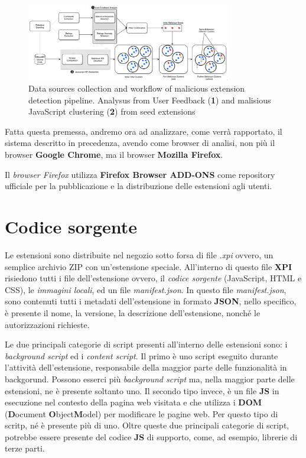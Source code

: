 \documentclass[ 11pt, oneside, italian, onehalfspacing, headsepline, ]{MastersDoctoralThesis}
\begin{document}
\begin{figure}[hbt!]
	\caption{Data sources collection and workflow of malicious extension detection pipeline. Analysus from User Feedback (\textbf{1}) and malisious JavaScript clustering (\textbf{2}) from seed extensions}\label{fig:summarydiagram}
	\centering
	\includegraphics[width=0.8\textwidth]{Summary_diagram.png}
\end{figure}

\par

Fatta questa premessa, andremo ora ad analizzare, come verrà rapportato, il sistema descritto in precedenza, avendo come browser di analisi, non più il browser \textbf{Google Chrome}, ma il browser \textbf{Mozilla Firefox}. \newline

Il \textit{browser Firefox} utilizza \textbf{Firefox Browser ADD-ONS} \citep{FirefoxAddOnsStore} come repository ufficiale per la pubblicazione e la distribuzione delle estensioni agli utenti. 

{\section{Codice sorgente}}

Le estensioni sono distribuite nel negozio sotto forsa di file \textit{.xpi} ovvero, un semplice archivio ZIP con un'estensione speciale. All'interno di questo file \textbf{XPI} risiedono tutti i file dell'estensione ovvero, il \textit{codice sorgente} (JavaScript, HTML e CSS), le \textit{immagini locali}, ed un file \textit{manifest.json}. In questo file \textit{manifest.json}, sono contenuti tutti i metadati dell'estensione in formato \textbf{JSON}, nello specifico, è presente il nome, la versione, la descrizione dell'estensione, nonché le autorizzazioni richieste. \newline

Le due principali categorie di script presenti all'interno delle estensioni sono: i \textit{background script} ed i \textit{content script}. Il primo  è uno script eseguito durante l'attività dell'estensione, responsabile della maggior parte delle funzionalità in backgorund. Possono esserci più \textit{background script} ma, nella maggior parte delle estensioni, ne è presente soltanto uno. Il secondo tipo invece, è un file \textbf{JS} in esecuzione nel contesto della pagina web visitata e che utilizza i \textbf{DOM} (\textbf{D}ocument \textbf{O}bject\textbf{M}odel) per modificare le pagine web. Per questo tipo di scritp, né è presente più di uno. Oltre queste due principali categorie di script, potrebbe essere presente del codice \textbf{JS} di supporto, come, ad esempio, librerie di terze parti.
\end{document}

